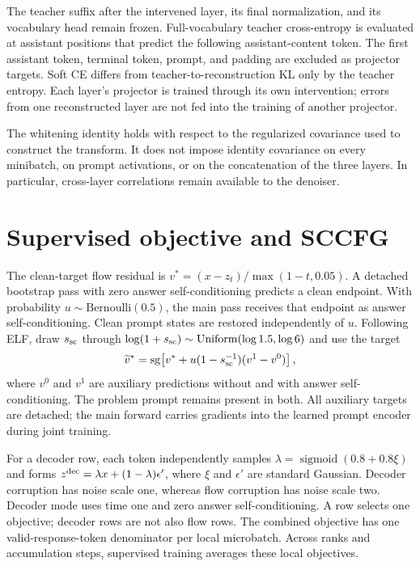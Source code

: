 The teacher suffix after the intervened layer, its final normalization, and its vocabulary head remain frozen. Full-vocabulary teacher cross-entropy is evaluated at assistant positions that predict the following assistant-content token. The first assistant token, terminal token, prompt, and padding are excluded as projector targets. Soft CE differs from teacher-to-reconstruction KL only by the teacher entropy. Each layer's projector is trained through its own intervention; errors from one reconstructed layer are not fed into the training of another projector.

The whitening identity holds with respect to the regularized covariance used to construct the transform. It does not impose identity covariance on every minibatch, on prompt activations, or on the concatenation of the three layers. In particular, cross-layer correlations remain available to the denoiser.

\section{Supervised objective and SCCFG}
\label{app:objective}
The clean-target flow residual is $v^*=(x-z_t)/\max(1-t,0.05)$. A detached bootstrap pass with zero answer self-conditioning predicts a clean endpoint. With probability $u\sim\mathrm{Bernoulli}(0.5)$, the main pass receives that endpoint as answer self-conditioning. Clean prompt states are restored independently of $u$. Following ELF, draw $s_{\rm sc}$ through $\log(1+s_{\rm sc})\sim\mathrm{Uniform}(\log1.5,\log6)$ and use the target
\begin{equation}
 \widetilde v^*=\operatorname{sg}\!\left[v^*+u(1-s_{\rm sc}^{-1})(v^1-v^0)\right],
\end{equation}
where $v^0$ and $v^1$ are auxiliary predictions without and with answer self-conditioning. The problem prompt remains present in both. All auxiliary targets are detached; the main forward carries gradients into the learned prompt encoder during joint training.

For a decoder row, each token independently samples $\lambda=\operatorname{sigmoid}(0.8+0.8\xi)$ and forms $z^{\rm dec}=\lambda x+(1-\lambda)\epsilon'$, where $\xi$ and $\epsilon'$ are standard Gaussian. Decoder corruption has noise scale one, whereas flow corruption has noise scale two. Decoder mode uses time one and zero answer self-conditioning. A row selects one objective; decoder rows are not also flow rows. The combined objective has one valid-response-token denominator per local microbatch. Across ranks and accumulation steps, supervised training averages these local objectives.

